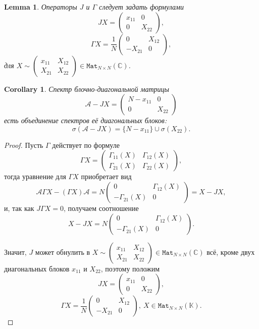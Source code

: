 \documentclass[14pt,a4paper]{extarticle}
\newtheorem{lem}{Lemma}
\newtheorem{crl}{Corollary}
\theoremstyle{definition}
\begin{document}
\begin{lem}
    Операторы \( J \) и \( \Gamma \)
    следует задать формулами
    \[
        J X = \begin{pmatrix} x_{11} & 0 \\ 0 & X_{22} \end{pmatrix}, \]
    \[
        \Gamma X = \frac{1}{N} \begin{pmatrix} 0 & X_{12} \\ -X_{21} & 0 \end{pmatrix}, \]
        для \( X\sim \begin{pmatrix}x_{11} & X_{12} \\ X_{21} & X_{22}\end{pmatrix} \in \mathtt{Mat}_{N{\times}N}(\mathbb{C}) \).

\end{lem}
\begin{crl}
    Спектр блочно-диагональной матрицы
    \[ \mathcal{A} - JX = \begin{pmatrix} N - x_{11} & 0 \\ 0 & X_{22} \end{pmatrix} \]
    есть объединение спектров е\"е диагональных блоков:
    \[
        \sigma(\mathcal{A} - J X) = \{ N - x_{11} \} \cup \sigma(X_{22}). \]
\end{crl}
\begin{proof}
Пусть \( \Gamma \) действует по формуле
\[ \Gamma X = \begin{pmatrix} \Gamma_{11}(X) & \Gamma_{12}(X) \\
                              \Gamma_{21}(X) & \Gamma_{22}(X)
                            \end{pmatrix}, \]
тогда уравнение для \( \Gamma X \) приобретает вид
    \[
        \mathcal{A} \Gamma X - (\Gamma X)\mathcal{A} =
        N
        \begin{pmatrix}
          0 & \Gamma_{12}(X) \\
          -\Gamma_{21}(X) & 0
        \end{pmatrix} = X - JX,
     \]
     и, так как \( J\Gamma X = 0 \), получаем соотношение
\[
    X - J X =
    N \begin{pmatrix} 0 & \Gamma_{12}(X) \\
        - \Gamma_{21}(X) & 0
        \end{pmatrix}. \]

Значит, \( J \) может обнулить в
    \( X \sim
    \begin{pmatrix}
    x_{11} & X_{12} \\
    X_{21} & X_{22}
    \end{pmatrix} \in \mathtt{Mat}_{N{\times}N}(\mathbb{C}) \)
    вс\"е, кроме двух диагональных блоков \( x_{11} \) и \( X_{22} \),
    поэтому положим
\[
    J X = \begin{pmatrix} x_{11} & 0 \\ 0 & X_{22} \end{pmatrix}, \]
\[
    \Gamma X = \frac{1}{N} \begin{pmatrix} 0 & X_{12} \\ -X_{21} &
      0 \end{pmatrix},\ X\in\mathtt{Mat}_{N{\times}N}(\mathbb{K}). 
\]
\end{proof}
\end{document}
